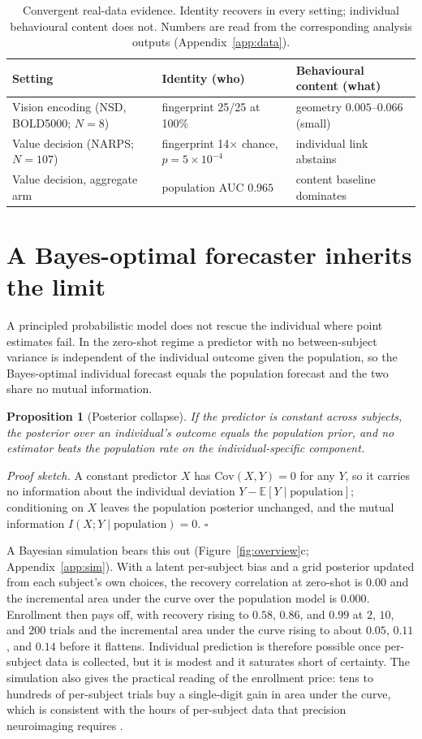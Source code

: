 \documentclass{article}
\newtheorem{proposition}{Proposition}
\begin{document}
\begin{table}[t]
\centering\small
\caption{Convergent real-data evidence. Identity recovers in every setting; individual behavioural content
does not. Numbers are read from the corresponding analysis outputs (Appendix~\ref{app:data}).}
\label{tab:real}
\begin{tabular}{@{}lll@{}}
\toprule
Setting & Identity (who) & Behavioural content (what) \\
\midrule
Vision encoding (NSD, BOLD5000; $N{=}8$) & fingerprint 25/25 at 100\% & geometry $0.005$--$0.066$ (small) \\
Value decision (NARPS; $N{=}107$) & fingerprint 14$\times$ chance, $p{=}5{\times}10^{-4}$ & individual link abstains \\
Value decision, aggregate arm & population AUC $0.965$ & content baseline dominates \\
\bottomrule
\end{tabular}
\end{table}

\section{A Bayes-optimal forecaster inherits the limit}
\label{sec:bayes}
A principled probabilistic model does not rescue the individual where point estimates fail. In the zero-shot
regime a predictor with no between-subject variance is independent of the individual outcome given the
population, so the Bayes-optimal individual forecast equals the population forecast and the two share no
mutual information.

\begin{proposition}[Posterior collapse]\label{prop:bayes}
If the predictor is constant across subjects, the posterior over an individual's outcome equals the
population prior, and no estimator beats the population rate on the individual-specific component.
\end{proposition}
\noindent\emph{Proof sketch.} A constant predictor $X$ has $\mathrm{Cov}(X,Y)=0$ for any $Y$, so it carries
no information about the individual deviation $Y-\mathbb{E}[Y\mid\text{population}]$; conditioning on $X$
leaves the population posterior unchanged, and the mutual information $I(X;Y\mid\text{population})=0$.
\hfill$\square$

A Bayesian simulation bears this out (Figure~\ref{fig:overview}c; Appendix~\ref{app:sim}). With a latent
per-subject bias and a grid posterior updated from each subject's own choices, the recovery correlation at
zero-shot is $0.00$ and the incremental area under the curve over the population model is $0.000$. Enrollment
then pays off, with recovery rising to $0.58$, $0.86$, and $0.99$ at $2$, $10$, and $200$ trials and the
incremental area under the curve rising to about $0.05$, $0.11$, and $0.14$ before it flattens. Individual
prediction is therefore possible once per-subject data is collected, but it is modest and it saturates short
of certainty. The simulation also gives the practical reading of the enrollment price: tens to hundreds of
per-subject trials buy a single-digit gain in area under the curve, which is consistent with the hours of
per-subject data that precision neuroimaging requires \citep{gordon2017}.
\end{document}
